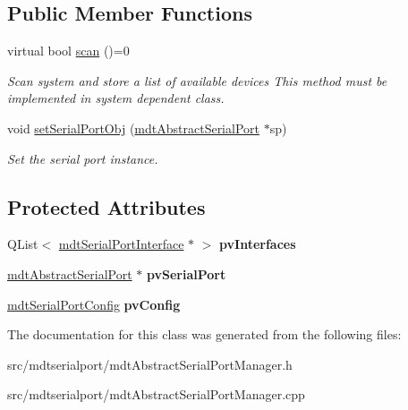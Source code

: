 \subsection*{Public Member Functions}
\begin{DoxyCompactItemize}
\item 
\hypertarget{classmdt_abstract_serial_port_manager_a4bed214d06614f9c2a590ca9acc97382}{
virtual bool \hyperlink{classmdt_abstract_serial_port_manager_a4bed214d06614f9c2a590ca9acc97382}{scan} ()=0}
\label{classmdt_abstract_serial_port_manager_a4bed214d06614f9c2a590ca9acc97382}

\begin{DoxyCompactList}\small\item\em Scan system and store a list of available devices This method must be implemented in system dependent class. \end{DoxyCompactList}\item 
\hypertarget{classmdt_abstract_serial_port_manager_a746b7a6f28b0c1b0e4136f34d5ba85c3}{
void \hyperlink{classmdt_abstract_serial_port_manager_a746b7a6f28b0c1b0e4136f34d5ba85c3}{setSerialPortObj} (\hyperlink{classmdt_abstract_serial_port}{mdtAbstractSerialPort} $\ast$sp)}
\label{classmdt_abstract_serial_port_manager_a746b7a6f28b0c1b0e4136f34d5ba85c3}

\begin{DoxyCompactList}\small\item\em Set the serial port instance. \end{DoxyCompactList}\end{DoxyCompactItemize}
\subsection*{Protected Attributes}
\begin{DoxyCompactItemize}
\item 
\hypertarget{classmdt_abstract_serial_port_manager_a5fc588facc012b941e66e8cef6f2e1a9}{
QList$<$ \hyperlink{classmdt_serial_port_interface}{mdtSerialPortInterface} $\ast$ $>$ {\bfseries pvInterfaces}}
\label{classmdt_abstract_serial_port_manager_a5fc588facc012b941e66e8cef6f2e1a9}

\item 
\hypertarget{classmdt_abstract_serial_port_manager_aef667f9380f6ebd2556f01f83f09942e}{
\hyperlink{classmdt_abstract_serial_port}{mdtAbstractSerialPort} $\ast$ {\bfseries pvSerialPort}}
\label{classmdt_abstract_serial_port_manager_aef667f9380f6ebd2556f01f83f09942e}

\item 
\hypertarget{classmdt_abstract_serial_port_manager_aa06a6bcc2c4c8acda5ac2d949174ca86}{
\hyperlink{classmdt_serial_port_config}{mdtSerialPortConfig} {\bfseries pvConfig}}
\label{classmdt_abstract_serial_port_manager_aa06a6bcc2c4c8acda5ac2d949174ca86}

\end{DoxyCompactItemize}


The documentation for this class was generated from the following files:\begin{DoxyCompactItemize}
\item 
src/mdtserialport/mdtAbstractSerialPortManager.h\item 
src/mdtserialport/mdtAbstractSerialPortManager.cpp\end{DoxyCompactItemize}
